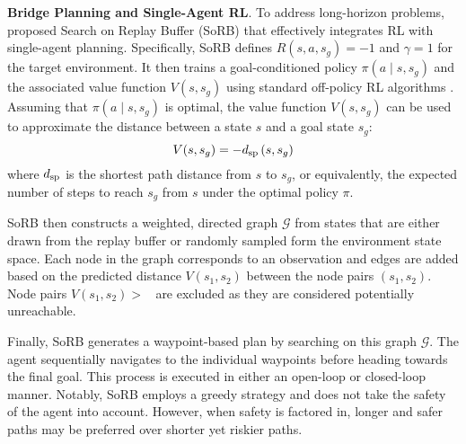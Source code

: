\documentclass[letterpaper, 10 pt, conference]{IEEEConference}
\DeclareMathOperator*{\maxdist}{d_{\text{max}}}
\begin{document}
\textbf{Bridge Planning and Single-Agent RL}. To address long-horizon problems, \cite{eysenbach2019search} proposed Search on Replay Buffer (SoRB) that effectively integrates RL with single-agent planning. Specifically, SoRB defines $R(s, a, s_g) = -1$ and $\gamma = 1$ for the target environment. It then trains a goal-conditioned policy \(\pi(a \mid s, s_g)\) and the associated value function $V(s, s_g)$ using standard off-policy RL algorithms \cite{lillicrap2019continuouscontroldeepreinforcement}. Assuming that \(\pi(a \mid s, s_g)\) is optimal, the value function $V(s, s_g)$ can be used to approximate the distance between a state $s$ and a goal state $s_g$:
\begin{equation}
    V(s,s_{g})=-d_{\textnormal{sp}}\left(s,s_{g}\right)\label{eq:distance_from_value_function}
\end{equation}
where $d_{\textnormal{sp}}$ is the shortest path distance from $s$ to $s_{g}$, or equivalently, the expected number of steps to reach $s_{g}$ from $s$ under the optimal policy $\pi$.

SoRB then constructs a weighted, directed graph $\mathcal{G}$ from states that are either drawn from the replay buffer or randomly sampled form the environment state space. Each node in the graph corresponds to an observation and edges are added based on the predicted distance $V(s_1, s_2)$ between the node pairs $(s_1, s_2)$. Node pairs $V(s_1, s_2) > \maxdist$ are excluded as they are considered potentially unreachable. 

Finally, SoRB generates a waypoint-based plan by searching on this graph $\mathcal{G}$. The agent sequentially navigates to the individual waypoints before heading towards the final goal. This process is executed in either an open-loop or closed-loop manner. Notably, SoRB employs a greedy strategy and does not take the safety of the agent into account. However, when safety is factored in, longer and safer paths may be preferred over shorter yet riskier paths. 
\end{document}
